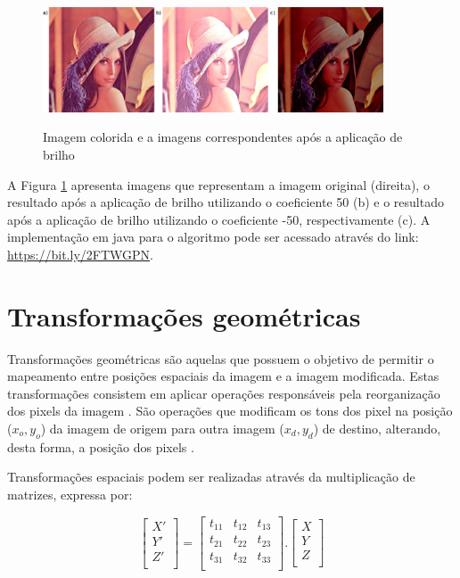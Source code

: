 \documentclass[
	12pt,				%
	oneside,			%
	a4paper,			%
	english,			%
	french,				%
	spanish,			%
	brazil,				%
	]{abntex2}
\begin{document}
\begin{figure}[ht]
\centering
\caption{Imagem colorida e a imagens correspondentes após a aplicação de brilho}
\includegraphics[width=0.9\textwidth]{imagens/brilho.png}
\sourceAuthor
\label{fig:brilho}
\end{figure}

A Figura \ref{fig:brilho} apresenta imagens que representam a imagem original (direita), o resultado após a aplicação de brilho utilizando o coeficiente 50 (b) e o resultado após a aplicação de brilho utilizando o coeficiente -50, respectivamente (c). A implementação em java para o algoritmo pode ser acessado através do link: \url{https://bit.ly/2FTWGPN}.

\section{Transformações geométricas}

Transformações geométricas são aquelas que possuem o objetivo de permitir o mapeamento entre posições espaciais da imagem e a imagem modificada. Estas transformações consistem em aplicar operações responsáveis pela reorganização dos pixels da imagem \cite{pedriniSchwartz:2008}. São operações que modificam os tons dos pixel na posição (\(x_o, y_o\)) da imagem de origem para outra imagem (\(x_d, y_d\)) de destino, alterando, desta forma, a posição dos pixels \cite{conciAzevedoLeta:2008}.

Transformações espaciais podem ser realizadas através da multiplicação de matrizes, expressa por:

\[
\begin{bmatrix}
    X'       \\ 
	Y'       \\ 
	Z'       \\ 
\end{bmatrix}
=
\begin{bmatrix}
    t_{11} & t_{12} & t_{13}  \\ 
	t_{21} & t_{22} & t_{23}  \\ 
	t_{31} & t_{32} & t_{33}  \\ 
\end{bmatrix}
.
\begin{bmatrix}
    X       \\ 
	Y       \\ 
	Z       \\ 
\end{bmatrix}
\]
\end{document}
